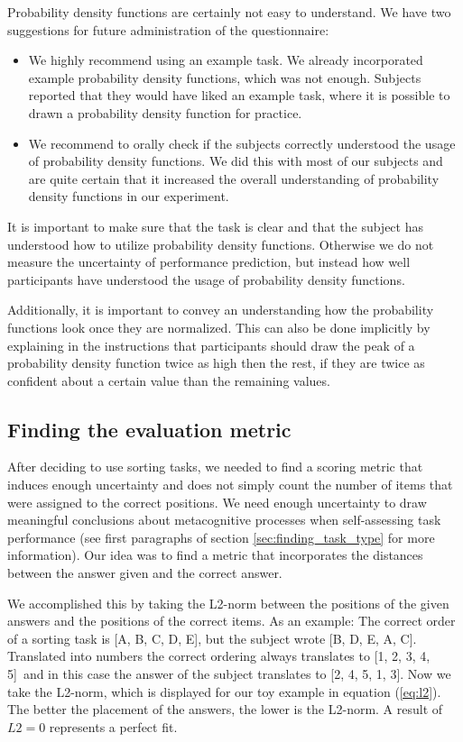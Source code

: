 \documentclass[../main/main.tex]{subfiles}
\begin{document}
	Probability density functions are certainly not easy to understand. We have two suggestions for future administration of the questionnaire:
	
	\begin{itemize}
		\item We highly recommend using an example task. We already incorporated example probability density functions, which was not enough. Subjects reported that they would have liked an example task, where it is possible to drawn a probability density function for practice.
		\item We recommend to orally check if the subjects correctly understood the usage of probability density functions. We did this with most of our subjects and are quite certain that it increased the overall understanding of probability density functions in our experiment.
	\end{itemize}
	
	\noindent It is important to make sure that the task is clear and that the subject has understood how to utilize probability density functions. Otherwise we do not measure the uncertainty of performance prediction, but instead how well participants have understood the usage of probability density functions.
	
	Additionally, it is important to convey an understanding how the probability functions look once they are normalized. This can also be done implicitly by explaining in the instructions that participants should draw the peak of a probability density function twice as high then the rest, if they are twice as confident about a certain value than the remaining values.
	
	\subsection{Finding the evaluation metric}
	\label{sec:finding_metric}
	
	After deciding to use sorting tasks, we needed to find a scoring metric that induces enough uncertainty and does not simply count the number of items that were assigned to the correct positions. We need enough uncertainty to draw meaningful conclusions about metacognitive processes when self-assessing task performance (see first paragraphs of section \ref{sec:finding_task_type} for more information). Our idea was to find a metric that incorporates the distances between the answer given and the correct answer.
	
	We accomplished this by taking the L2-norm between the positions of the given answers and the positions of the correct items. As an example: The correct order of a sorting task is [A, B, C, D, E], but the subject wrote [B, D, E, A, C]. Translated into numbers the correct ordering always translates to [1, 2, 3, 4, 5] and in this case the answer of the subject translates to [2, 4, 5, 1, 3]. Now we take the L2-norm, which is displayed for our toy example in equation (\ref{eq:l2}). The better the placement of the answers, the lower is the L2-norm. A result of $L2 = 0$ represents a perfect fit.
	
\end{document}
